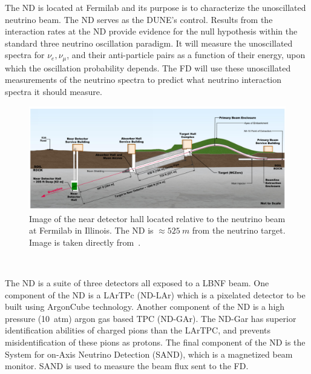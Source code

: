 The ND is located at Fermilab and its purpose is to characterize the unoscillated neutrino beam.
The ND serves as the DUNE's control.
Results from the interaction rates at the ND provide evidence for the null hypothesis within the standard three neutrino oscillation paradigm.
It will measure the unoscillated spectra for $\nu_{e}, \nu_{\mu}$, and their anti-particle pairs as a function of their energy, upon which the oscillation probability depends.
The FD will use these unoscillated measurements of the neutrino spectra to predict what neutrino interaction spectra it should measure.

\begin{figure}[]
\centering
\includegraphics[width=\textwidth]{images/dune_nd_beamline_tdrv1.png}
\caption{Image of the near detector hall located relative to the neutrino beam at Fermilab in Illinois.
The ND is $\approx 525~\unit{m}$ from the neutrino target.
Image is taken directly from~\citep{DUNE_TDR_V1_Abi_2020}.
}
\end{figure}~\label{fig:dune_nd_beamline}

The ND is a suite of three detectors all exposed to a LBNF beam.
One component of the ND is a LArTPc (ND-LAr) which is a pixelated detector to be built using ArgonCube technology.
Another component of the ND is a high pressure (10~\unit{atm}) argon gas based TPC (ND-GAr).
The ND-Gar has superior identification abilities of charged pions than the LArTPC, and prevents misidentification of these pions as protons.
The final component of the ND is the System for on-Axis Neutrino Detection (SAND), which is a magnetized beam monitor.
SAND is used to measure the beam flux sent to the FD.

